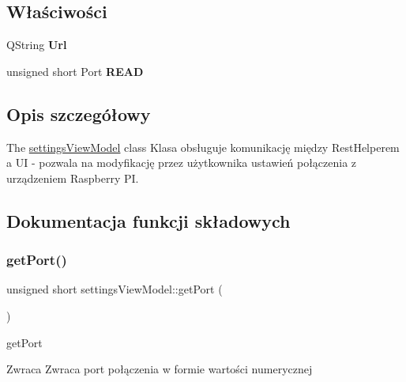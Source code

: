 \subsection*{Właściwości}
\begin{DoxyCompactItemize}
\item 
\mbox{\label{classsettings_view_model_af82b4874e05dd9dba5dde4cf46f8d94d}} 
Q\+String {\bfseries Url}
\item 
\mbox{\label{classsettings_view_model_ac352510bc5895c88437107b000988935}} 
unsigned short Port {\bfseries R\+E\+AD}
\end{DoxyCompactItemize}


\subsection{Opis szczegółowy}
The \mbox{\hyperlink{classsettings_view_model}{settings\+View\+Model}} class Klasa obsługuje komunikację między Rest\+Helperem a UI -\/ pozwala na modyfikację przez użytkownika ustawień połączenia z urządzeniem Raspberry PI. 

\subsection{Dokumentacja funkcji składowych}
\mbox{\label{classsettings_view_model_a021d67fc746244e4522cc6f38656cc1d}} 
\subsubsection{\texorpdfstring{get\+Port()}{getPort()}}
{\footnotesize\ttfamily unsigned short settings\+View\+Model\+::get\+Port (\begin{DoxyParamCaption}{ }\end{DoxyParamCaption})}



get\+Port 

\begin{DoxyReturn}{Zwraca}
Zwraca port połączenia w formie wartości numerycznej 
\end{DoxyReturn}
\mbox{\label{classsettings_view_model_a6f81d1950b115d808899e5ea2fa607b3}} 
